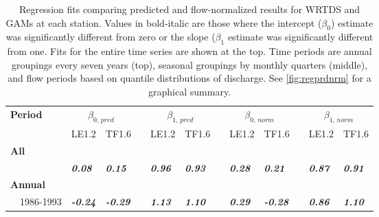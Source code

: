 \documentclass[letterpaper,12pt,oneside]{article}\usepackage[]{graphicx}\usepackage[]{color}
\begin{document}
\begin{table}[!tbp]
\caption{Regression fits comparing predicted and flow-normalized results for \ac{WRTDS} and \acp{GAM} at each station.  Values in bold-italic are those where the intercept ($\beta_0$) estimate was significantly different from zero or the slope ($\beta_{1}$ estimate was significantly different from one. Fits for the entire time series are shown at the top.  Time periods are annual groupings every seven years (top), seasonal groupings by monthly quarters (middle), and flow periods based on quantile distributions of discharge.  See \cref{fig:regprdnrm} for a graphical summary.\label{tab:regprdnrm}} 
\begin{center}
\begin{tabular}{lllcllcllcll}
\hline\hline
\multicolumn{1}{l}{\bfseries Period}&\multicolumn{2}{c}{\bfseries $\beta_{0,\,pred}$}&\multicolumn{1}{c}{\bfseries }&\multicolumn{2}{c}{\bfseries $\beta_{1,\,pred}$}&\multicolumn{1}{c}{\bfseries }&\multicolumn{2}{c}{\bfseries $\beta_{0,\,norm}$}&\multicolumn{1}{c}{\bfseries }&\multicolumn{2}{c}{\bfseries $\beta_{1,\,norm}$}\tabularnewline
\cline{2-3} \cline{5-6} \cline{8-9} \cline{11-12}
\multicolumn{1}{l}{}&\multicolumn{1}{c}{LE1.2}&\multicolumn{1}{c}{TF1.6}&\multicolumn{1}{c}{}&\multicolumn{1}{c}{LE1.2}&\multicolumn{1}{c}{TF1.6}&\multicolumn{1}{c}{}&\multicolumn{1}{c}{LE1.2}&\multicolumn{1}{c}{TF1.6}&\multicolumn{1}{c}{}&\multicolumn{1}{c}{LE1.2}&\multicolumn{1}{c}{TF1.6}\tabularnewline
\hline
{\bfseries All}&&&&&&&&&&&\tabularnewline
~~&{\bf \textit{0.08}}&{\bf \textit{0.15}}&&{\bf \textit{0.96}}&{\bf \textit{0.93}}&&{\bf \textit{0.28}}&{\bf \textit{0.21}}&&{\bf \textit{0.87}}&{\bf \textit{0.91}}\tabularnewline
\hline
{\bfseries Annual}&&&&&&&&&&&\tabularnewline
~~1986-1993&{\bf \textit{-0.24}}&{\bf \textit{-0.29}}&&{\bf \textit{1.13}}&{\bf \textit{1.10}}&&{\bf \textit{0.29}}&{\bf \textit{-0.28}}&&{\bf \textit{0.86}}&{\bf \textit{1.10}}\tabularnewline

\end{tabular}
\end{center}
\end{table}
\end{document}
